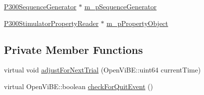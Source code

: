 \begin{DoxyCompactItemize}
\item 
\hyperlink{classOpenViBEApplications_1_1P300SequenceGenerator}{P300SequenceGenerator} $\ast$ \hyperlink{classOpenViBEApplications_1_1ExternalP300Stimulator_a239309173dd9b4750a535963c79290b0}{m\_\-pSequenceGenerator}
\item 
\hyperlink{classOpenViBEApplications_1_1P300StimulatorPropertyReader}{P300StimulatorPropertyReader} $\ast$ \hyperlink{classOpenViBEApplications_1_1ExternalP300Stimulator_a294b0df7b2fddeff88e37c3703b5080d}{m\_\-pPropertyObject}
\end{DoxyCompactItemize}
\subsection*{Private Member Functions}
\begin{DoxyCompactItemize}
\item 
virtual void \hyperlink{classOpenViBEApplications_1_1ExternalP300Stimulator_afe7bae4d8e163c49042fa0d098c1a81d}{adjustForNextTrial} (OpenViBE::uint64 currentTime)
\item 
virtual OpenViBE::boolean \hyperlink{classOpenViBEApplications_1_1ExternalP300Stimulator_a8bdf89654b4590fa164cb4b7036d6dc0}{checkForQuitEvent} ()
\end{DoxyCompactItemize}
